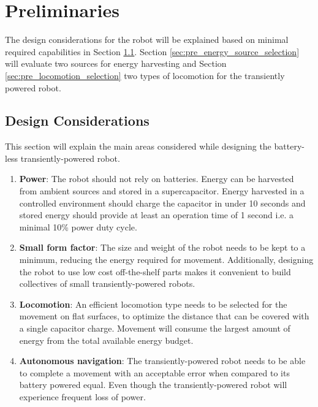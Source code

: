 \chapter{Preliminaries}
\label{chp:preliminaries}

The design considerations for the robot will be explained based on minimal required capabilities in Section \ref{sec:pre_design_considerations}.
Section \ref{sec:pre_energy_source_selection} will evaluate two sources for energy harvesting and Section \ref{sec:pre_locomotion_selection} two types of locomotion for the transiently powered robot.

\section{Design Considerations}
\label{sec:pre_design_considerations}

This section will explain the main areas considered while designing the battery-less transiently-powered robot.

\begin{enumerate}
	\item \textbf{Power}: 
	The robot should not rely on batteries.
	Energy can be harvested from ambient sources and stored in a supercapacitor. 
	Energy harvested in a controlled environment should charge the capacitor in under 10 seconds and stored energy should provide at least an operation time of 1 second i.e. a minimal 10\% power duty cycle.
	
	\item \textbf{Small form factor}: 
	The size and weight of the robot needs to be kept to a minimum, reducing the energy required for movement.
	Additionally, designing the robot to use low cost off-the-shelf parts makes it convenient to build collectives of small transiently-powered robots.
	
	\item \textbf{Locomotion}:
	An efficient locomotion type needs to be selected for the movement on flat surfaces, to optimize the distance that can be covered with a single capacitor charge.
	Movement will consume the largest amount of energy from the total available energy budget.

	\item \textbf{Autonomous navigation}:
	The transiently-powered robot needs to be able to complete a movement with an acceptable error when compared to its battery powered equal.
	Even though the transiently-powered robot will experience frequent loss of power. 
\end{enumerate}

